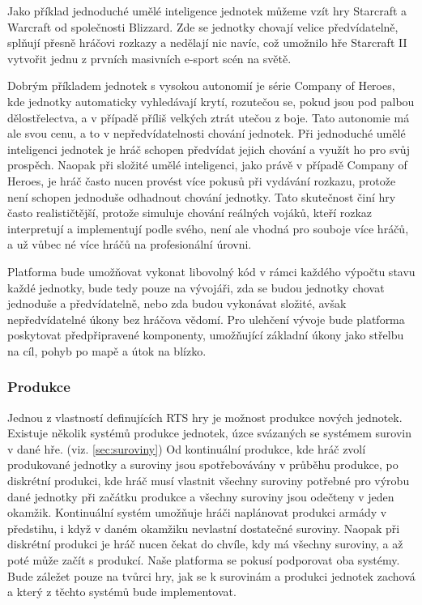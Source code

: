 Jako příklad jednoduché umělé inteligence jednotek můžeme vzít hry Starcraft a Warcraft od společnosti Blizzard. Zde se jednotky chovají velice předvídatelně, splňují přesně hráčovi rozkazy a nedělají nic navíc, což umožnilo hře Starcraft II vytvořit jednu z prvních masivních e-sport scén na světě. \citep{site:gamasutra01}


Dobrým příkladem jednotek s vysokou autonomií je série Company of Heroes, kde jednotky automaticky vyhledávají krytí, rozutečou se, pokud jsou pod palbou dělostřelectva, a v případě příliš velkých ztrát utečou z boje. Tato autonomie má ale svou cenu, a to v nepředvídatelnosti chování jednotek. Při jednoduché umělé inteligenci jednotek je hráč schopen předvídat jejich chování a využít ho pro svůj prospěch. Naopak při složité umělé inteligenci, jako právě v případě Company of Heroes, je hráč často nucen provést více pokusů při vydávání rozkazu, protože není schopen jednoduše odhadnout chování jednotky. Tato skutečnost činí hry často realističtější, protože simuluje chování reálných vojáků, kteří rozkaz interpretují a implementují podle svého, není ale vhodná pro souboje více hráčů, a už vůbec né více hráčů na profesionální úrovni.

Platforma bude umožňovat vykonat libovolný kód v rámci každého výpočtu stavu každé jednotky, bude tedy pouze na vývojáři, zda se budou jednotky chovat jednoduše a předvídatelně, nebo zda budou vykonávat složité, avšak nepředvídatelné úkony bez hráčova vědomí. Pro ulehčení vývoje bude platforma poskytovat předpřipravené komponenty, umožňující základní úkony jako střelbu na cíl, pohyb po mapě a útok na blízko.

\subsubsection{Produkce}

Jednou z vlastností definujících RTS hry je možnost produkce nových jednotek. Existuje několik systémů produkce jednotek, úzce svázaných se systémem surovin v dané hře. (viz. \ref{sec:suroviny})  Od kontinuální produkce, kde hráč zvolí produkované jednotky a suroviny jsou spotřebovávány v průběhu produkce, po diskrétní produkci, kde hráč musí vlastnit všechny suroviny potřebné pro výrobu dané jednotky při začátku produkce a všechny suroviny jsou odečteny v jeden okamžik. Kontinuální systém umožňuje hráči naplánovat produkci armády v předstihu, i když v daném okamžiku nevlastní dostatečné suroviny. Naopak při diskrétní produkci je hráč nucen čekat do chvíle, kdy má všechny suroviny, a až poté může začít s produkcí. Naše platforma se pokusí podporovat oba systémy. Bude záležet pouze na tvůrci hry, jak se k surovinám a produkci jednotek zachová a který z těchto systémů bude implementovat.

